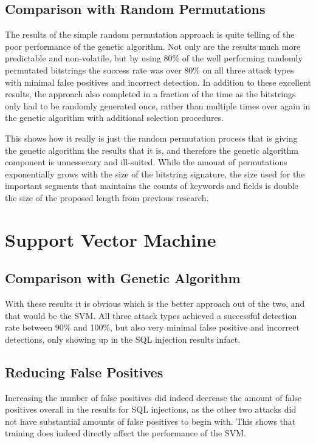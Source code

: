 \subsection{Comparison with Random Permutations}\label{sec:randDiscussion}

The results of the simple random permutation approach is quite telling of the poor performance of the genetic algorithm.  Not only are the results much more predictable and non-volatile, but by using 80\% of the well performing randomly permutated bitstrings the success rate was over 80\% on all three attack types with minimal false positives and incorrect detection.  In addition to these excellent results, the approach also completed in a fraction of the time as the bitstrings only had to be randomly generated once, rather than multiple times over again in the genetic algorithm with additional selection procedures.

This shows how it really is just the random permutation process that is giving the genetic algorithm the results that it is, and therefore the genetic algorithm component is unnessecary and ill-suited.  While the amount of permutations exponentially grows with the size of the bitstring signature, the size used for the important segments that maintains the counts of keywords and fields is double the size of the proposed length from previous research.

\section{Support Vector Machine}
\subsection{Comparison with Genetic Algorithm}

With these results it is obvious which is the better approach out of the two, and that would be the SVM.  All three attack types achieved a successful detection rate between 90\% and 100\%, but also very minimal false positive and incorrect detections, only showing up in the SQL injection results infact.  

\subsection{Reducing False Positives}

Increasing the number of false positives did indeed decrease the amount of false positives overall in the results for SQL injections, as the other two attacks did not have substantial amounts of false positives to begin with.  This shows that training does indeed directly affect the performance of the SVM. 

